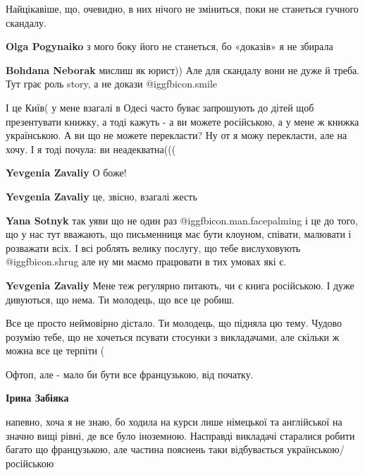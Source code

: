 \begin{itemize}
\begin{itemize}
\end{itemize} %


Найцікавіше, що, очевидно, в них нічого не зміниться, поки не станеться гучного
скандалу.

\begin{itemize} %
\textbf{Olga Pogynaiko} з мого боку його не станеться, бо «доказів» я не збирала

\textbf{Bohdana Neborak} мислиш як юрист)) Але для скандалу вони не дуже й треба. Тут грає роль story, а не докази  @igg{fbicon.smile} 
\end{itemize} %


І це Київ( у мене взагалі в Одесі часто буває запрошують до дітей щоб
презентувати книжку, а тоді кажуть - а ви можете російською, а у мене ж книжка
українською. А ви що не можете перекласти? Ну от я можу перекласти, але на
хочу. І я тоді почула: ви неадекватна(((

\begin{itemize} %
\textbf{Yevgenia Zavaliy} О боже!

\textbf{Yevgenia Zavaliy} це, звісно, взагалі жесть

\textbf{Yana Sotnyk} так уяви що не один раз  @igg{fbicon.man.facepalming}  і це до того, що у нас тут вважають, що письменниця має бути клоуном, співати, малювати і розважати всіх. І всі роблять велику послугу, що тебе вислуховують  @igg{fbicon.shrug}  але ну ми маємо працювати в тих умовах які є.

\textbf{Yevgenia Zavaliy} Мене теж регулярно питають, чи є книга російською. І дуже дивуються, що нема. Ти молодець, що все це робиш.
\end{itemize} %


Все це просто неймовірно дістало. Ти молодець, що підняла цю тему. Чудово
розумію тебе, що не хочеться псувати стосунки з викладачами, але скільки ж
можна все це терпіти (

Офтоп, але - мало би бути все французькою, від початку.

\begin{itemize} %
\textbf{Ірина Забіяка} 

напевно, хоча я не знаю, бо ходила на курси лише німецької та англійської на
значно вищі рівні, де все було іноземною. Насправді викладачі старалися робити
багато що французькою, але частина пояснень таки відбувається
українською/російською


\end{itemize}
\end{itemize}
